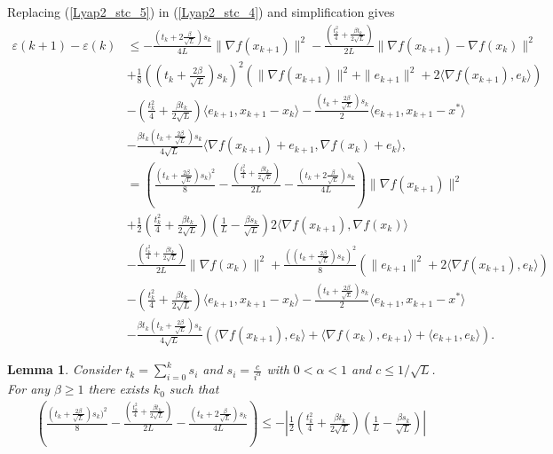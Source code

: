 \documentclass{article}
\theoremstyle{plain}
\newtheorem{lemma}[theorem]{Lemma}
\theoremstyle{definition}
\theoremstyle{remark}
\begin{document}
        Replacing (\ref{Lyap2_stc_5}) in (\ref{Lyap2_stc_4}) and simplification gives
        \begin{align}\label{Lyap2_stc_6}
            \varepsilon(k+1)-\varepsilon(k)&\leq -\frac{(t_k+2\frac{\beta}{\sqrt{L}})s_k}{4L} \|\nabla f(x_{k+1})\|^2-\frac{(\frac{t_{k}^2}{4}+\frac{\beta t_{k}}{2\sqrt{L}})}{2L}\|\nabla f(x_{k+1})-\nabla f(x_k)\|^2\nonumber\\
            &+\frac{1}{8}((t_k+\frac{2\beta}{\sqrt{L}})s_k)^2(\|\nabla f(x_{k+1})\|^2+\|e_{k+1}\|^2+2\langle \nabla f(x_{k+1}) ,e_k \rangle) \nonumber\\
            & -(\frac{t_k^2}{4}+\frac{\beta t_k}{2\sqrt{L}})\langle e_{k+1},x_{k+1}-x_k\rangle-\frac{(t_k+\tfrac{2\beta}{\sqrt{L}})s_k}{2}\langle e_{k+1},x_{k+1}-x^*\rangle\nonumber\\
         & -\frac{\beta t_k(t_k+\frac{2\beta}{\sqrt{L}})s_k}{4\sqrt{L}}\langle \nabla f(x_{k+1})+e_{k+1}, \nabla f(x_k)+e_k \rangle,\nonumber\\
         &=\left( \frac{(t_k+\frac{2\beta}{\sqrt{L}})s_k)^2}{8}- \frac{(\frac{t_{k}^2}{4}+\frac{\beta t_{k}}{2\sqrt{L}})}{2L}- \frac{(t_k+2\frac{\beta}{\sqrt{L}})s_k}{4L}\right)\|\nabla f(x_{k+1})\|^2\nonumber\\
         &+\frac{1}{2}\left(\frac{t_k^2}{4}+\frac{\beta t_k}{2\sqrt{L}} \right)(\frac{1}{L}-\frac{\beta s_k}{\sqrt{L}}) 2\langle \nabla f(x_{k+1}),\nabla f(x_k) \rangle\nonumber\\
         &-\frac{(\frac{t_{k}^2}{4}+\frac{\beta t_{k}}{2\sqrt{L}})}{2L}\|\nabla f(x_k)\|^2+\frac{((t_k+\frac{2\beta}{\sqrt{L}})s_k)^2}{8}(\|e_{k+1}\|^2+2\langle \nabla f(x_{k+1}) ,e_k \rangle)\nonumber\\
         & -(\frac{t_k^2}{4}+\frac{\beta t_k}{2\sqrt{L}})\langle e_{k+1},x_{k+1}-x_k\rangle-\frac{(t_k+\tfrac{2\beta}{\sqrt{L}})s_k}{2}\langle e_{k+1},x_{k+1}-x^*\rangle\nonumber\\
         &-\frac{\beta t_k(t_k+\frac{2\beta}{\sqrt{L}})s_k}{4\sqrt{L}}\left(\langle \nabla f(x_{k+1}),e_k \rangle+\langle \nabla f(x_{k}) , e_{k+1}\rangle+\langle e_{k+1},e_k\rangle\right).
        \end{align}
        \begin{lemma}\label{lem1}
            Consider $t_k=\sum_{i=0}^k s_i$ and $s_i=\frac{c}{i^{\alpha}}$ with $0<\alpha<1$ and $c\leq 1/\sqrt{L}$. For any $\beta\geq 1$ there exists $k_0$ such that 
            \begin{align}\label{lem1_eqn1}
                \left( \frac{(t_k+\frac{2\beta}{\sqrt{L}})s_k)^2}{8}- \frac{(\frac{t_{k}^2}{4}+\frac{\beta t_{k}}{2\sqrt{L}})}{2L}- \frac{(t_k+2\frac{\beta}{\sqrt{L}})s_k}{4L}\right)\leq -\left|\frac{1}{2}\left(\frac{t_k^2}{4}+\frac{\beta t_k}{2\sqrt{L}} \right)(\frac{1}{L}-\frac{\beta s_k}{\sqrt{L}})\right|
            \end{align}
        \end{lemma}
\end{document}
